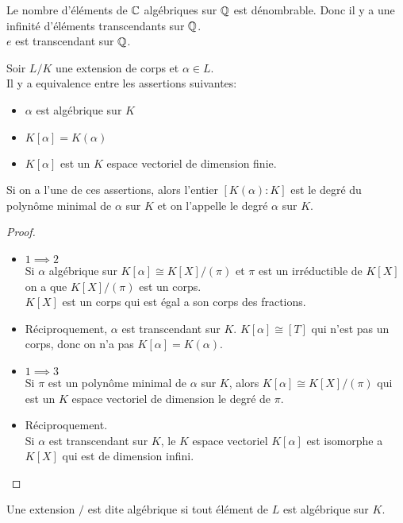 \begin{remarque}
	Le nombre d'éléments de $\mathbb{C}$ algébriques sur $\mathbb{Q}$ est dénombrable. Donc il y a une infinité d'éléments transcendants sur $\mathbb{Q}$.\\
	$e$ est transcendant sur $\mathbb{Q}$.
\end{remarque}


\begin{prop}
	Soir $L/K$ une extension de corps et $\alpha \in L$.\\
	Il y a equivalence entre les assertions suivantes:
	\begin{itemize}
		\item  $\alpha$ est algébrique sur $K$
		\item $K[\alpha] = K(\alpha)$
		\item $K[\alpha]$ est un $K$ espace vectoriel de dimension finie.
	\end{itemize}
	Si on a l'une de ces assertions, alors l'entier $[K(\alpha) : K]$ est le degré du polynôme minimal de $\alpha$ sur $K$ et on l'appelle le degré $\alpha$ sur $K$.
\end{prop}

\begin{proof}
	\begin{itemize}
		\item $1 \implies 2$\\
		      Si $\alpha$ algébrique sur $K[\alpha] \cong K[X]/(\pi)$ et $\pi$ est un irréductible de $K[X]$ on a que $K[X]/(\pi)$ est un corps.\\
		      $K[X]$ est un corps qui est égal a son corps des fractions.
		\item Réciproquement, $\alpha$ est transcendant sur $K$.
		      $K[\alpha] \cong [T]$ qui n'est pas un corps, donc on n'a pas $K[\alpha] = K(\alpha)$.
		\item $1 \implies 3$\\
		      Si $\pi$ est un polynôme minimal de $\alpha$ sur $K$, alors $K[\alpha] \cong K[X]/(\pi)$ qui est un $K$ espace vectoriel de dimension le degré de $\pi$.
		\item Réciproquement. \\
		      Si $\alpha$ est transcendant sur $K$, le $K$ espace vectoriel $K[\alpha]$ est isomorphe a $K[X]$ qui est de dimension infini.
	\end{itemize}
\end{proof}

\begin{definition}
	Une extension $/$ est dite algébrique si tout élément de $L$ est algébrique sur $K$.\\
\end{definition}

